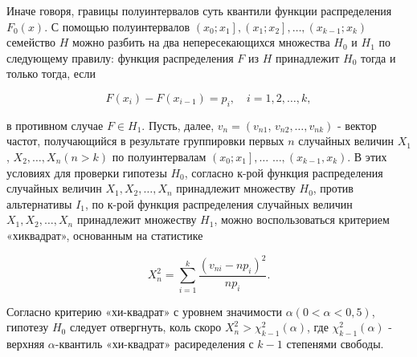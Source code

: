 \documentclass[10pt]{article}
\begin{document}
Иначе говоря, гравицы полуинтервалов суть квантили функции распределения $F_{0}(x)$. С помощью полуинтервалов $\left(x_{0} ; x_{1}\right],\left(x_{1} ; x_{2}\right], \ldots,\left(x_{k-1} ; x_{k}\right)$ семейство $H$ можно разбить на два непересекающихся множества $H_{0}$ и $H_{1}$ по следующему правилу: функция распределения $F$ из $H$ принадлежит $H_{0}$ тогда и только тогда, если



\[

F\left(x_{i}\right)-F\left(x_{i-1}\right)=p_{i}, \quad i=1,2, \ldots, k,

\]



в противном случае $F \in H_{1}$. Пусть, далее, $v_{n}=\left(v_{n 1}\right.$, $\left.v_{n 2}, \ldots, v_{n k}\right)$ - вектор частот, получающийся в результате группировки первых $n$ случайных величин $X_{1}$, $X_{2}, \ldots, X_{n}(n>k)$ по полуинтервалам $\left(x_{0} ; x_{1}\right], \ldots$ $\ldots,\left(x_{k-1}, x_{k}\right)$. В этих условиях для проверки гипотезы $H_{0}$, согласно к-рой функция распределения случайных величин $X_{1}, X_{2}, \ldots, X_{n}$ принадлежит множеству $H_{0}$, против альтернативы $I_{1}$, по к-рой функция распределения случайных величин $X_{1}, X_{2}, \ldots, X_{n}$ принадлежит множеству $H_{1}$, можно воспользоваться критерием «хиквадрат», основанным на статистике



\[

X_{n}^{2}=\sum_{i=1}^{k} \frac{\left(v_{n i}-n p_{i}\right)^{2}}{n p_{i}} .

\]



Согласно критерию «хи-квадрат» с уровнем значимости $\alpha(0<\alpha<0,5)$, гипотезу $H_{0}$ следует отвергнуть, коль скоро $X_{n}^{2}>\chi_{k-1}^{2}(\alpha)$, где $\chi_{k-1}^{2}(\alpha)$ - верхняя $\alpha$-квантиль «хи-квадрат» расиределения с $k-1$ степенями свободы.
\end{document}
